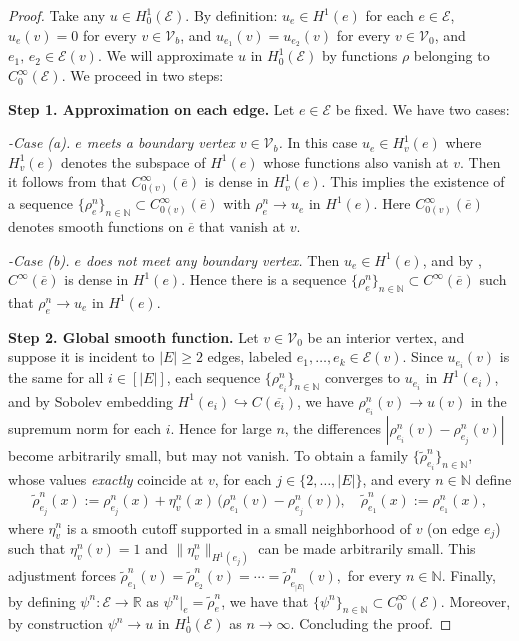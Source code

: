 \documentclass[10pt,a4paper]{amsart}
\def\N{\mathbb N}
\def\to{\rightarrow}
\begin{document}
\begin{proof} Take any $u \in H_0^1(\mathcal{E})$. By definition: $u_e \in H^1(e)$ for each $e \in \mathcal{E}$, $u_e(v) = 0$ for every $v\in \mathcal{V}_b$, and $ u_{e_1}(v) = u_{e_2}(v)$ for every $v\in \mathcal{V}_0$, and $e_1,\,e_2 \in \mathcal{E}(v)$. We will approximate $u$ in $H_0^1(\mathcal{E})$ by functions $\rho$ belonging to $C^\infty_0(\mathcal{E})$. We proceed in two steps:
\smallbreak

\noindent
\textbf{Step 1. Approximation on each edge.}
Let $e \in \mathcal{E}$ be fixed. We have two cases:

\noindent
\emph{-Case (a). $e$ meets a boundary vertex $v \in \mathcal{V}_b$.}
In this case  $u_e \in H^1_v(e)$ where $H^1_v(e)$ denotes the subspace of $H^1(e)$ whose functions also vanish at $v$. Then it follows from \cite[Section 8.3]{brezis_book} that $C^\infty_{0(v)}(\overline{e})$ is dense in $H^1_v(e)$. This implies the existence of a sequence $\{\rho_e^n\}_{n\in \N}\subset C^\infty_{0(v)}(\overline{e})$ with $\rho_e^n \to u_e$ in $H^1(e)$. Here $C^\infty_{0(v)}(\overline{e})$ denotes smooth functions on $\overline{e}$ that vanish at $v$.

\noindent
\emph{-Case (b). $e$ does not meet any boundary vertex.}
Then $u_e \in H^1(e)$, and by \cite[Section 5.3.3]{evans_book}, $C^\infty(\overline{e})$ is dense in $H^1(e)$. Hence there is a sequence $\{\rho_e^n\}_{n\in \N}\subset C^\infty(\overline{e})$ such that $\rho_e^n\to u_e$ in $H^1(e)$.
\smallbreak


\noindent
\textbf{Step 2. Global smooth function.}
Let $v \in \mathcal{V}_0$ be an interior vertex, and suppose it is incident to $|E| \ge 2$ edges, labeled $e_1,\dots,e_k \in \mathcal{E}(v)$. Since $u_{e_i}(v)$ is the same for all $i\in[|E|]$, each sequence $\{\rho_{e_i}^n\}_{n\in \N}$ converges to $u_{e_i}$ in $H^1(e_i)$, and by Sobolev embedding $H^1(e_i)\hookrightarrow C(\overline{e_i})$, we have $\rho_{e_i}^n(v)\to u(v)$ in the supremum norm for each $i$. Hence for large $n$, the differences $|\rho_{e_i}^n(v)-\rho_{e_j}^n(v)|$ become arbitrarily small, but may not vanish. To obtain a family $\{\tilde{\rho}_{e_i}^n\}_{n\in\N}$, whose values \emph{exactly} coincide at $v$, for each $j\in \{2,\dots,|E|\}$, and every $n\in \N$ define
\begin{align*}
\tilde{\rho}_{e_j}^n(x)
:=
\rho_{e_j}^n(x) 
+ 
\eta_v^n(x)\,\bigl(\rho_{e_1}^n(v)-\rho_{e_j}^n(v)\bigr),
\quad
\tilde{\rho}_{e_1}^n(x) := \rho_{e_1}^n(x),
\end{align*}
where $\eta_v^n$ is a smooth cutoff supported in a small neighborhood of $v$ (on edge $e_j$) such that $\eta_v^n(v)=1$ and $\|\eta_v^n\|_{H^1(e_j)}$ can be made arbitrarily small. This adjustment forces $\tilde{\rho}_{e_1}^n(v) 
=
\tilde{\rho}_{e_2}^n(v)
=\cdots=
\tilde{\rho}_{e_{|E|}}^n(v),$ for every $n\in \N$. Finally, by defining $\psi^n \colon \mathcal{E}\to \mathbb{R}$ as $\psi^n|_e =\tilde{\rho}_e^n$, we have that $\{\psi^n\}_{n\in \N}\subset C^\infty_0(\mathcal{E})$. Moreover, by construction $\psi^n\to u$ in $H_0^1(\mathcal{E})$ as $n\to \infty$. Concluding the proof.

\end{proof}
\end{document}
